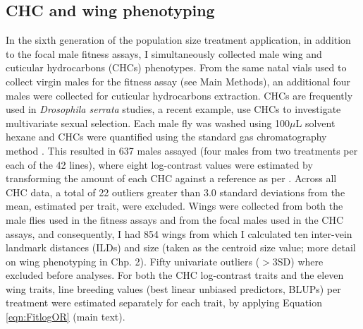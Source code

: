 \subsection{CHC and wing phenotyping}
In the sixth generation of the population size treatment application, in addition to the focal male fitness assays, I simultaneously collected male wing and cuticular hydrocarbons (CHCs) phenotypes. From the same natal vials used to collect virgin males for the fitness assay (see Main Methods), an additional four males were collected for cuticular hydrocarbons extraction. CHCs are frequently used in \textit{Drosophila serrata} studies, a recent example, \citet{Redd21} use CHCs to investigate multivariate sexual selection. Each male fly was washed using 100$\mu$L solvent hexane and CHCs were quantified using the standard gas chromatography method \citep{Blow98}. This resulted in 637 males assayed (four males from two treatments per each of the 42 lines), where eight log-contrast values were estimated by transforming the amount of each CHC against a reference as per \citet{Aitc82}. Across all CHC data, a total of 22 outliers greater than 3.0 standard deviations from the mean, estimated per trait, were excluded. Wings were collected from both the male flies used in the fitness assays and from the focal males used in the CHC assays, and consequently, I had 854 wings from which I calculated ten inter-vein landmark distances (ILDs) and size (taken as the centroid size value; more detail on wing phenotyping in Chp. 2). Fifty univariate outliers ($>3$SD) where excluded before analyses. For both the CHC log-contrast traits and the eleven wing traits, line breeding values (best linear unbiased predictors, BLUPs) per treatment were estimated separately for each trait, by applying Equation \ref{eqn:FitlogOR} (main text).\par

